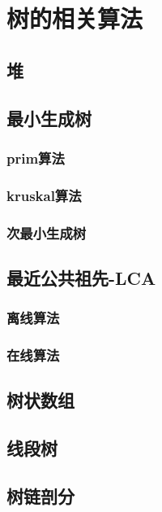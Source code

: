 \section{树的相关算法}

\subsection{堆}
\subsection{最小生成树}
\subsubsection{prim算法}
\subsubsection{kruskal算法}
\subsubsection{次最小生成树}
\subsection{最近公共祖先-LCA}
\subsubsection{离线算法}
\subsubsection{在线算法}
\subsection{树状数组}
\subsection{线段树}
\subsection{树链剖分}

